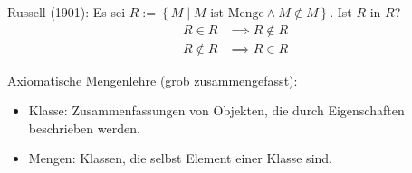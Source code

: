 \begin{remark}
Russell (1901): Es sei $R := \left\{ M \middle| M \text{ ist Menge} \wedge M \not\in M \right\}$. Ist $R$ in $R$?
\begin{align*}
  R \in R &\implies R \not\in R \\
  R \not\in R &\implies R \in R
\end{align*}

Axiomatische Mengenlehre (grob zusammengefasst):
\begin{itemize}
\item Klasse: Zusammenfassungen von Objekten, die durch Eigenschaften beschrieben werden.
\item Mengen: Klassen, die selbst Element einer Klasse sind.
\end{itemize}
\end{remark}

